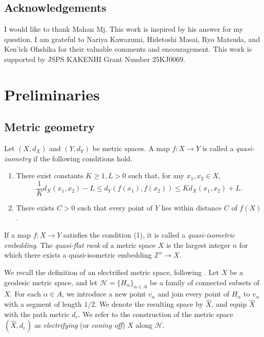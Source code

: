 \documentclass[a4paper,11pt]{amsart}
\numberwithin{equation}{section}
\theoremstyle{definition}
\newcommand{\Z}{\mathbb{Z}}%
\begin{document}
\subsection*{Acknowledgements}
I would like to thank Mahan Mj.
This work is inspired by his answer for my question.
I am grateful to Nariya Kawazumi, Hidetoshi Masai, Ryo Matsuda, and Ken'ich Ohshika for their valuable comments and encouragement.
This work is supported by JSPS KAKENHI Grant Number	25KJ0069.


\section{Preliminaries}

\subsection{Metric geometry}
Let $(X,d_X)$ and $(Y,d_Y)$ be metric spaces.
A map $f\colon X\to Y$ is called a \emph{quasi-isometry} if the following conditions hold.
\begin{enumerate}
    \item There exist constants $K\geq 1, L>0$ such that, for any $x_1,x_2 \in X$, 
    \begin{equation*}
        \frac{1}{K} d_X(x_1,x_2)-L \leq d_Y(f(x_1),f(x_2)) \leq Kd_X(x_1,x_2)+L.
    \end{equation*}
    \item There exists $C>0$ such that every point of $Y$ lies within distance $C$ of $f(X)$.
\end{enumerate}
If a map $f\colon X\to Y$ satisfies the condition (1), it is called a \emph{quasi-isometric embedding}.
The \emph{quasi-flat rank} of a metric space $X$ is the largest integer $n$ for which there exists a quasi-isometric embedding $\Z^n\to X$.
\vspace{2mm}

We recall the definition of an electrified metric space, following \cite{farb1998relative}.
Let $X$ be a geodesic metric space, and let $\mathcal{H}=\{H_\alpha\}_{\alpha\in A}$ be a family of connected subsets of $X$.
For each $\alpha\in A$, we introduce a new point $v_\alpha$ and join every point of $H_\alpha$ to $v_\alpha$ with a segment of length $1/2$.
We denote the resulting space by $\hat{X}$, and equip $\hat{X}$ with the path metric $d_e$.
We refer to the construction of the metric space $(\hat{X},d_e)$ as \emph{electrifying} (or \emph{coning off}) $X$ along $\mathcal{H}$.
\end{document}
